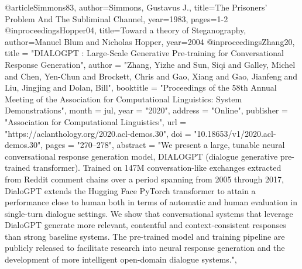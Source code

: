 \documentclass[english,version-2020-11]{uzl-thesis}
\begin{document}
%

\begin{bibtex-entries}
@article{Simmons83,
   author={Simmons, Gustavus J.},
   title={The Prisoners' Problem And The Subliminal Channel},
   year=1983,
   pages={1-2}
}
@inproceedings{Hopper04,
  title={Toward a theory of Steganography},
  author={Manuel Blum and Nicholas Hopper},
  year={2004}
}
@inproceedings{Zhang20,
    title = "{DIALOGPT} : Large-Scale Generative Pre-training for Conversational Response Generation",
    author = "Zhang, Yizhe  and
      Sun, Siqi  and
      Galley, Michel  and
      Chen, Yen-Chun  and
      Brockett, Chris  and
      Gao, Xiang  and
      Gao, Jianfeng  and
      Liu, Jingjing  and
      Dolan, Bill",
    booktitle = "Proceedings of the 58th Annual Meeting of the Association for Computational Linguistics: System Demonstrations",
    month = jul,
    year = "2020",
    address = "Online",
    publisher = "Association for Computational Linguistics",
    url = "https://aclanthology.org/2020.acl-demos.30",
    doi = "10.18653/v1/2020.acl-demos.30",
    pages = "270--278",
    abstract = "We present a large, tunable neural conversational response generation model, DIALOGPT (dialogue generative pre-trained transformer). Trained on 147M conversation-like exchanges extracted from Reddit comment chains over a period spanning from 2005 through 2017, DialoGPT extends the Hugging Face PyTorch transformer to attain a performance close to human both in terms of automatic and human evaluation in single-turn dialogue settings. We show that conversational systems that leverage DialoGPT generate more relevant, contentful and context-consistent responses than strong baseline systems. The pre-trained model and training pipeline are publicly released to facilitate research into neural response generation and the development of more intelligent open-domain dialogue systems.",
}
\end{bibtex-entries}



%
%
%
%
\end{document}
